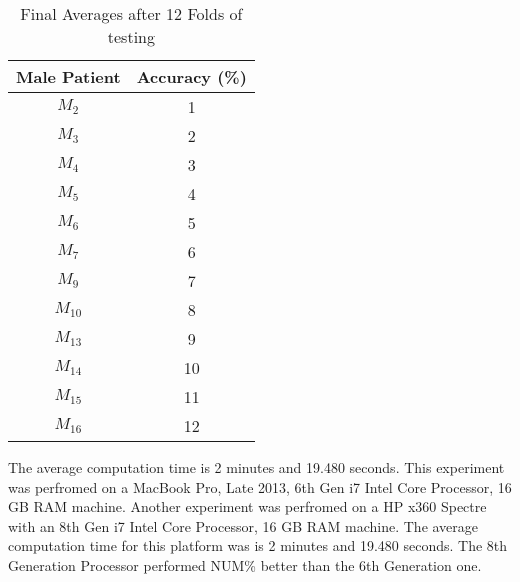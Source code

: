 \begin{table}[h!]
\centering
\begin{tabular}{||c c||} 
\hline
Male Patient & Accuracy (\%)  \\ [0.5ex] 
\hline \hline
$M_2$ & 1  \\ 
\hline
$M_3$ & 2  \\ 
\hline
$M_4$ & 3  \\ 
\hline
$M_5$ & 4  \\ 
\hline
$M_6$ & 5  \\ 
\hline
$M_7$ & 6  \\ 
\hline
$M_9$ & 7  \\ 
\hline
$M_{10}$ & 8  \\ 
\hline
$M_{13}$ & 9  \\ 
\hline
$M_{14}$ & 10  \\ 
\hline
$M_{15}$ & 11  \\ 
\hline 
$M_{16}$ & 12  \\ 
\hline 
\hline
\end{tabular}
\caption{Final Averages after 12 Folds of testing}
\label{table:results}
\end{table}

The average computation time is 2 minutes and 19.480 seconds. This experiment was 
perfromed on a MacBook Pro, Late 2013, 6th Gen i7 Intel Core Processor, 16 GB 
RAM machine. Another experiment was perfromed on a HP x360 Spectre with an 8th Gen i7 Intel 
Core Processor, 16 GB RAM machine. The average computation time 
for this platform was is 2 minutes and 19.480 seconds. The 8th Generation 
Processor performed NUM\% better than the 6th Generation one.
